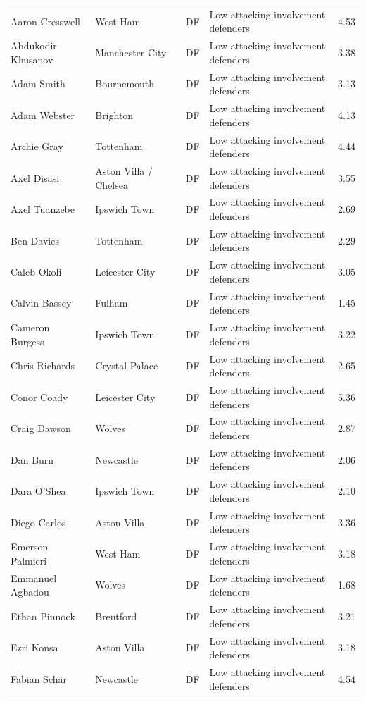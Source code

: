 \begin{longtable}{p{3.4cm}p{2.5cm}p{1.0cm}p{5.0cm}r}
Aaron Cresswell & West Ham & DF & Low attacking involvement defenders & 4.53 \\
Abdukodir Khusanov & Manchester City & DF & Low attacking involvement defenders & 3.38 \\
Adam Smith & Bournemouth & DF & Low attacking involvement defenders & 3.13 \\
Adam Webster & Brighton & DF & Low attacking involvement defenders & 4.13 \\
Archie Gray & Tottenham & DF & Low attacking involvement defenders & 4.44 \\
Axel Disasi & Aston Villa / Chelsea & DF & Low attacking involvement defenders & 3.55 \\
Axel Tuanzebe & Ipswich Town & DF & Low attacking involvement defenders & 2.69 \\
Ben Davies & Tottenham & DF & Low attacking involvement defenders & 2.29 \\
Caleb Okoli & Leicester City & DF & Low attacking involvement defenders & 3.05 \\
Calvin Bassey & Fulham & DF & Low attacking involvement defenders & 1.45 \\
Cameron Burgess & Ipswich Town & DF & Low attacking involvement defenders & 3.22 \\
Chris Richards & Crystal Palace & DF & Low attacking involvement defenders & 2.65 \\
Conor Coady & Leicester City & DF & Low attacking involvement defenders & 5.36 \\
Craig Dawson & Wolves & DF & Low attacking involvement defenders & 2.87 \\
Dan Burn & Newcastle & DF & Low attacking involvement defenders & 2.06 \\
Dara O'Shea & Ipswich Town & DF & Low attacking involvement defenders & 2.10 \\
Diego Carlos & Aston Villa & DF & Low attacking involvement defenders & 3.36 \\
Emerson Palmieri & West Ham & DF & Low attacking involvement defenders & 3.18 \\
Emmanuel Agbadou & Wolves & DF & Low attacking involvement defenders & 1.68 \\
Ethan Pinnock & Brentford & DF & Low attacking involvement defenders & 3.21 \\
Ezri Konsa & Aston Villa & DF & Low attacking involvement defenders & 3.18 \\
Fabian Schär & Newcastle & DF & Low attacking involvement defenders & 4.54 \\

\end{longtable}

